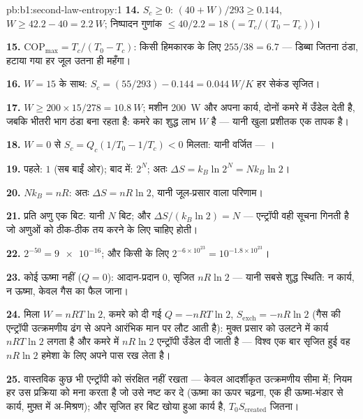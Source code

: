 \begin{solution}{pb:b1:second-law-entropy:1}
\textbf{14.} $S_c \geq 0$: $(40 + W)/293 \geq 0.144$, $W \geq 42.2 - 40 =
\qty{2.2}{W}$; निष्पादन गुणांक $\leq 40/2.2 = 18$ ($= T_c/(T_0 - T_c)$)।

\textbf{15.} $\mathrm{COP}_{\max} = T_c/(T_0 - T_c)$: किसी हिमकारक के लिए $255/38 = 6.7$
--- डिब्बा जितना ठंडा, हटाया गया हर जूल उतना ही महँगा।

\textbf{16.} $W = 15$ के साथ: $S_c = (55/293) - 0.144 = \qty{0.044}{W/K}$ हर
सेकंड सृजित।

\textbf{17.} $W \geq 200 \times 15/278 = \qty{10.8}{W}$; मशीन \qty{200}{W} और
अपना कार्य, दोनों कमरे में उँडेल देती है, जबकि भीतरी भाग ठंडा बना रहता है:
कमरे का शुद्ध लाभ $W$ है --- यानी खुला प्रशीतक एक तापक है।

\textbf{18.} $W = 0$ से $S_c = Q_c(1/T_0 - 1/T_c) < 0$ मिलता: यानी वर्जित ---
।

\textbf{19.} पहले: $1$ (सब बाईं ओर); बाद में: $2^N$; अतः $\Delta S = k_B\ln2^N =
Nk_B\ln2$।

\textbf{20.} $Nk_B = nR$: अतः $\Delta S = nR\ln2$, यानी जूल-प्रसार वाला परिणाम।

\textbf{21.} प्रति अणु एक बिट: यानी $N$ बिट; और $\Delta S/(k_B\ln2) = N$ ---
एन्ट्रॉपी वही सूचना गिनती है जो अणुओं को ठीक-ठीक तय करने के लिए चाहिए
होती।

\textbf{22.} $2^{-50} = \num{9e-16}$; और किसी  के लिए $2^{-6\times10^{23}} =
10^{-1.8\times10^{23}}$।

\textbf{23.} कोई ऊष्मा नहीं ($Q = 0$): आदान-प्रदान $0$, सृजित $nR\ln2$ ---
यानी सबसे शुद्ध स्थिति: न कार्य, न ऊष्मा, केवल गैस का फैल जाना।

\textbf{24.} मिला $W = nRT\ln2$, कमरे को दी गई $Q = -nRT\ln2$,
$S_{\mathrm{exch}} = -nR\ln2$ (गैस की एन्ट्रॉपी उत्क्रमणीय ढंग से अपने आरंभिक
मान पर लौट आती है): मुक्त प्रसार को उलटने में कार्य $nRT\ln2$ लगता है और
कमरे में $nR\ln2$ एन्ट्रॉपी उँडेल दी जाती है --- विश्व एक बार सृजित हुई वह
$nR\ln2$ हमेशा के लिए अपने पास रख लेता है।

\textbf{25.} वास्तविक कुछ भी एन्ट्रॉपी को संरक्षित नहीं रखता --- केवल
आदर्शीकृत उत्क्रमणीय सीमा में; नियम हर उस प्रक्रिया को मना करता है जो उसे
नष्ट कर दे (ऊष्मा का ऊपर चढ़ना, एक ही ऊष्मा-भंडार से कार्य, मुफ़्त में
अ-मिश्रण); और सृजित हर बिट खोया हुआ कार्य है, $T_0S_{\mathrm{created}}$ जितना।
\end{solution}
